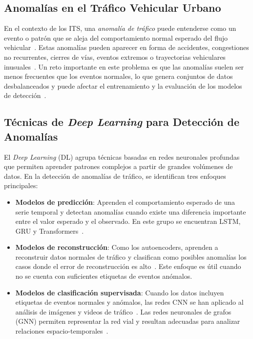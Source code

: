 \documentclass[12pt, a4paper]{article}
\begin{document}
\subsection{Anomal\'{i}as en el Tr\'{a}fico Vehicular Urbano}

En el contexto de los ITS, una \textit{anomal\'{i}a de tr\'{a}fico} puede entenderse como un evento o patr\'{o}n que se aleja del comportamiento normal esperado del flujo vehicular~\cite{zhang2022automatic}. Estas anomal\'{i}as pueden aparecer en forma de accidentes, congestiones no recurrentes, cierres de v\'{i}as, eventos extremos o trayectorias vehiculares inusuales~\cite{hu2022detecting}. Un reto importante en este problema es que las anomal\'{i}as suelen ser menos frecuentes que los eventos normales, lo que genera conjuntos de datos desbalanceados y puede afectar el entrenamiento y la evaluaci\'{o}n de los modelos de detecci\'{o}n~\cite{mehrannia2023deep}.

\subsection{T\'{e}cnicas de \textit{Deep Learning} para Detecci\'{o}n de Anomal\'{i}as}

El \textit{Deep Learning} (DL) agrupa t\'{e}cnicas basadas en redes neuronales profundas que permiten aprender patrones complejos a partir de grandes vol\'{u}menes de datos. En la detecci\'{o}n de anomal\'{i}as de tr\'{a}fico, se identifican tres enfoques principales:

\begin{itemize}
  \item \textbf{Modelos de predicci\'{o}n}: Aprenden el comportamiento esperado de una serie temporal y detectan anomal\'{i}as cuando existe una diferencia importante entre el valor esperado y el observado. En este grupo se encuentran LSTM, GRU y Transformers~\cite{jadhav2025multistage}.
  \item \textbf{Modelos de reconstrucci\'{o}n}: Como los autoencoders, aprenden a reconstruir datos normales de tr\'{a}fico y clasifican como posibles anomal\'{i}as los casos donde el error de reconstrucci\'{o}n es alto~\cite{chakraborty2023structural}. Este enfoque es \'{u}til cuando no se cuenta con suficientes etiquetas de eventos an\'{o}malos.
  \item \textbf{Modelos de clasificaci\'{o}n supervisada}: Cuando los datos incluyen etiquetas de eventos normales y an\'{o}malos, las redes CNN se han aplicado al an\'{a}lisis de im\'{a}genes y videos de tr\'{a}fico~\cite{khan2022anomaly}. Las redes neuronales de grafos (GNN) permiten representar la red vial y resultan adecuadas para analizar relaciones espacio-temporales~\cite{park2025graph}.
\end{itemize}
\end{document}

